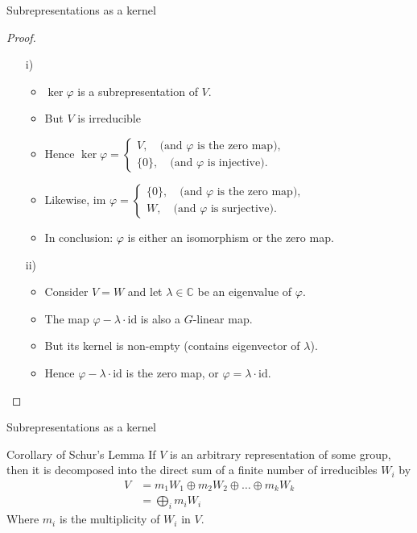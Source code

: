 \documentclass[10pt]{beamer}
\newcommand{\id}{\text{id}}
\newcommand{\CC}{\mathbb{C}}
\begin{document}
	\begin{frame}{Subrepresentations as a kernel}
		\begin{proof}
			\begin{itemize}
				\item[i)] \begin{itemize}
					\item $\ker\varphi$ is a subrepresentation of $V$.\pause
					\item But $V$ is irreducible
					\item Hence $\ker \varphi = \begin{cases}
						V, \quad \text{(and $\varphi$ is the zero map),} \\
						\{0\}, \quad \text{(and $\varphi$ is injective)}.
					\end{cases}$\pause
					\item Likewise, $\text{im } \varphi = \begin{cases}
						\{0\}, \quad \text{(and $\varphi$ is the zero map)}, \\
						W, \quad \text{(and $\varphi$ is surjective)}.
					\end{cases}$\pause
					\item In conclusion: $\varphi$ is either an isomorphism or the zero map.
				\end{itemize}\pause
				\item[ii)] \begin{itemize}
					\item Consider $V = W$ and let $\lambda \in \CC$ be an eigenvalue of $\varphi$.\pause
					
					\item The map $\varphi - \lambda \cdot \id$ is also a $G$-linear map.\pause
					
					\item But its kernel is non-empty (contains eigenvector of $\lambda$).\pause
					
					\item Hence $\varphi - \lambda \cdot \id$ is the zero map, or $\varphi = \lambda \cdot \id$. \qedhere
				\end{itemize}
			\end{itemize}
		\end{proof}
	\end{frame}
	\begin{frame}{Subrepresentations as a kernel}
		\begin{block}{Corollary of Schur's Lemma}
			If $V$ is an arbitrary representation of some group, then it is decomposed into the direct sum of a finite number of irreducibles $W_i$ by 
			\begin{align*}
				V &= m_1W_1 \oplus m_2W_2 \oplus \dots \oplus m_kW_k \\
				&= \bigoplus_i m_i W_i
			\end{align*}
			Where $m_i$ is the multiplicity of $W_i$ in $V$.
		\end{block}
	\end{frame}
	
\end{document}
